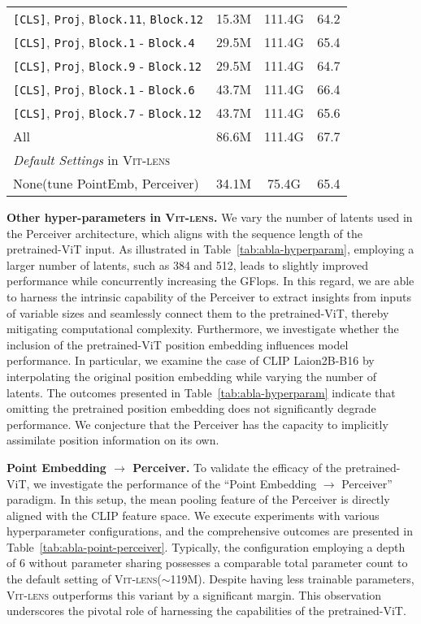 \documentclass{article}
\newcommand{\ptvit}{pretrained-ViT\xspace}
\newcommand{\methodname}{{\scshape Vit-lens}\xspace}
\begin{document}
\begin{table}[t]
\begin{subtable}[h]{0.53\textwidth}
{{\begin{tabular}{l|cc|c}
  \texttt{[CLS]}, \texttt{Proj}, \texttt{Block.11}, \texttt{Block.12}  &  15.3M    & 111.4G   &  64.2    \\
  \texttt{[CLS]}, \texttt{Proj}, \texttt{Block.1} - \texttt{Block.4}    & 29.5M     & 111.4G   &  65.4    \\
  \texttt{[CLS]}, \texttt{Proj}, \texttt{Block.9} - \texttt{Block.12}    & 29.5M     & 111.4G   &  64.7    \\
  \texttt{[CLS]}, \texttt{Proj}, \texttt{Block.1} - \texttt{Block.6}    & 43.7M     & 111.4G   &   66.4   \\
  \texttt{[CLS]}, \texttt{Proj}, \texttt{Block.7} - \texttt{Block.12}    & 43.7M     & 111.4G   &  65.6    \\
  All & 86.6M  &  111.4G     &  67.7     \\ \midrule
\multicolumn{4}{l}{\textit{Default Settings} in \methodname} \\ \Xhline{2\arrayrulewidth}
  \rowcolor{lavenderweb}
  None(tune PointEmb, Perceiver) & 34.1M & 75.4G &  65.4
\end{tabular}
}
}
\end{subtable}
\end{table} 
\textbf{Other hyper-parameters in \methodname.} We vary the number of latents used in the Perceiver architecture, which aligns with the sequence length of the \ptvit input. As illustrated in Table~\ref{tab:abla-hyperparam}, employing a larger number of latents, such as 384 and 512, leads to slightly improved performance while concurrently increasing the GFlops.  
In this regard, we are able to harness the intrinsic capability of the Perceiver to extract insights from inputs of variable sizes and seamlessly connect them to the \ptvit, thereby mitigating computational complexity.
Furthermore, we investigate whether the inclusion of the \ptvit position embedding influences model performance. In particular, we examine the case of CLIP Laion2B-B16 by interpolating the original position embedding while varying the number of latents. The outcomes presented in Table~\ref{tab:abla-hyperparam} indicate that omitting the pretrained position embedding does not significantly degrade performance. We conjecture that the Perceiver has the capacity to implicitly assimilate position information on its own.


\textbf{Point Embedding $\rightarrow$ Perceiver.} To validate the efficacy of the \ptvit, we investigate the performance of the ``Point Embedding $\rightarrow$ Perceiver'' paradigm. In this setup, the mean pooling feature of the Perceiver is directly aligned with the CLIP feature space. We execute experiments with various hyperparameter configurations, and the comprehensive outcomes are presented in Table~\ref{tab:abla-point-perceiver}.
Typically, the configuration employing a depth of 6 without parameter sharing possesses a comparable total parameter count to the default setting of \methodname ($\sim$119M). Despite having less trainable parameters, \methodname outperforms this variant by a significant margin. This observation underscores the pivotal role of harnessing the capabilities of the \ptvit.
\end{document}
